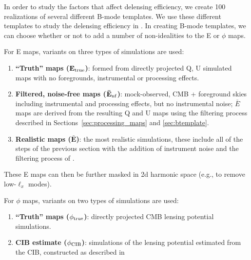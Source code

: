 In order to study the factors that affect delensing efficiency, we create 100 realizations of several different B-mode templates.
We use these different templates to study the delensing efficiency in .
In creating B-mode templates, we can choose whether or not to add a number of non-idealities to the E or $\phi$ maps.

For E maps, variants on three types of simulations are used:
\begin{enumerate}[leftmargin=0.5cm]
 \item{\textbf{``Truth'' maps ($\mathbf{E_{\rm true}}$)}: formed from directly projected Q, U simulated maps with no foregrounds, instrumental or processing effects.}
  \item{\textbf{Filtered, noise-free maps ($\mathbf{\bar{E}_{\rm nf}}$)}: mock-observed, CMB + foreground skies including instrumental and processing effects, but no instrumental noise; $\bar{E}$ maps are derived from the resulting Q and U maps using the filtering process described in Sections~\ref{sec:processing_maps} and \ref{sec:btemplate}.}
  \item{\textbf{Realistic maps ($\mathbf{\bar{E}}$)}: the most realistic simulations, these include all of the steps of the previous section with the addition of instrument noise and the filtering process of .}
\end{enumerate}
These E maps can then be further masked in 2d harmonic space (e.g., to remove low-$\ell_x$ modes).

For $\phi$ maps, variants on two types of simulations are used:
\begin{enumerate}[leftmargin=0.5cm]
  \item{\textbf{``Truth'' maps ($\mathbf{\phi_{\rm true}}$)}: directly projected CMB lensing potential simulations.}
  \item{\textbf{CIB estimate ($\mathbf{\phi_{\rm CIB}}$)}: simulations of the lensing potential estimated from the CIB, constructed as described in }
\end{enumerate}

